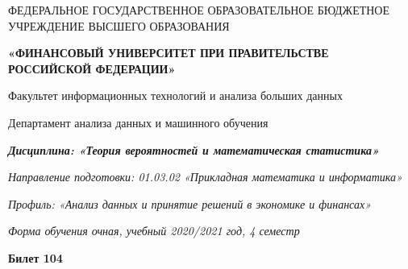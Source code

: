 \documentclass[a4paper,14pt]{article}
\begin{document}
\begin{center}
ФЕДЕРАЛЬНОЕ ГОСУДАРСТВЕННОЕ ОБРАЗОВАТЕЛЬНОЕ БЮДЖЕТНОЕ УЧРЕЖДЕНИЕ ВЫСШЕГО ОБРАЗОВАНИЯ

    \textbf{«ФИНАНСОВЫЙ УНИВЕРСИТЕТ ПРИ ПРАВИТЕЛЬСТВЕ РОССИЙСКОЙ ФЕДЕРАЦИИ»}

Факультет информационных технологий и анализа больших данных

Департамент анализа данных и машинного обучения

\textit{
	\textbf{Дисциплина: «Теория вероятностей и математическая статистика»}}

\textit{Направление подготовки: 01.03.02 «Прикладная математика и информатика»}

\textit{Профиль: «Анализ данных и принятие решений в экономике и финансах»}

\textit{Форма обучения очная, учебный 2020/2021 год, 4 семестр}

\textbf{Билет 104}

\end{center}
\end{document}
